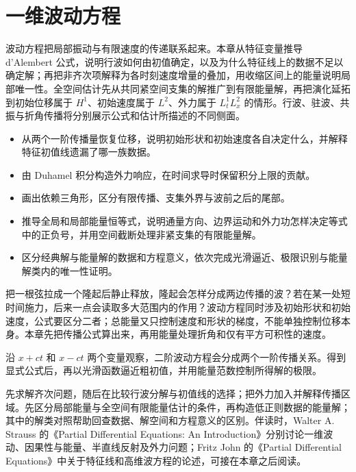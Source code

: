 \chapter{一维波动方程}
\label{b2:ch:09}
\begin{chapterabstract}
波动方程把局部振动与有限速度的传递联系起来。本章从特征变量推导 d'Alembert 公式，说明行波如何由初值确定，以及为什么特征线上的数据不足以确定解；再把非齐次项解释为各时刻速度增量的叠加，用收缩区间上的能量说明局部唯一性。全空间估计先从共同紧空间支集的解推广到有限能量解，再把演化延拓到初始位移属于 \(H^1\)、初始速度属于 \(L^2\)、外力属于 \(L^1_tL^2_x\) 的情形。行波、驻波、共振与折角传播将分别展示公式和估计所描述的不同侧面。
\end{chapterabstract}
\begin{learninggoals}
\begin{itemize}
\item\label{b2:item:09-goal-characteristic}从两个一阶传播量恢复位移，说明初始形状和初始速度各自决定什么，并解释特征初值线遗漏了哪一族数据。
\item\label{b2:item:09-goal-forcing}由 Duhamel 积分构造外力响应，在时间求导时保留积分上限的贡献。
\item\label{b2:item:09-goal-cone}画出依赖三角形，区分有限传播、支集外界与波前之后的尾部。
\item\label{b2:item:09-goal-energy}推导全局和局部能量恒等式，说明通量方向、边界运动和外力功怎样决定等式中的正负号，并用空间截断处理非紧支集的有限能量解。
\item\label{b2:item:09-goal-limit}区分经典解与能量解的数据和方程意义，依次完成光滑逼近、极限识别与能量解类内的唯一性证明。
\end{itemize}
\end{learninggoals}

把一根弦拉成一个隆起后静止释放，隆起会怎样分成两边传播的波？若在某一处短时间施力，后来一点会读取多大范围内的作用？波动方程同时涉及初始形状和初始速度，公式要区分二者；总能量又只控制速度和形状的梯度，不能单独控制位移本身。本章先把传播公式算出来，再用能量处理折角和仅有平方可积性的速度。

\ProseParagraphBreak

沿 \(x+ct\) 和 \(x-ct\) 两个变量观察，二阶波动方程会分成两个一阶传播关系。得到显式公式后，再以光滑函数逼近粗初值，并用能量范数控制所得解的极限。

\ProseParagraphBreak

先求解齐次问题，随后在比较行波分解与初值线的选择；把外力加入并解释传播区域。先区分局部能量与全空间有限能量估计的条件，再构造低正则数据的能量解；其中的解类对照帮助回查数据、解空间和方程意义的区别。伴读时，Walter A. Strauss 的《Partial Differential Equations: An Introduction》\cite[Sections 2.1--2.2, 3.2, 3.4]{Strauss2008Partial}分别讨论一维波动、因果性与能量、半直线反射及外力问题；Fritz John 的《Partial Differential Equations》\cite{John1991Partial}中关于特征线和高维波方程的论述，可接在本章之后阅读。

